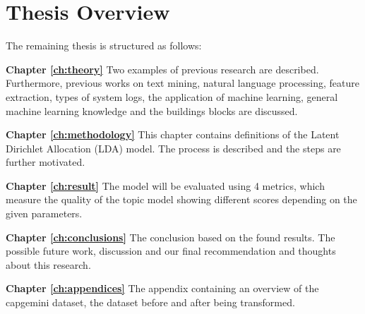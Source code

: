 \section{Thesis Overview} \label{introduction:thesisoverview}
The remaining thesis is structured as follows:

\setlength{\parindent}{3ex} \textbf{Chapter \ref{ch:theory}}\: Two examples of previous research are described. Furthermore, previous works on text mining, natural language processing, feature extraction, types of system logs, the application of machine learning, general machine learning knowledge and the buildings blocks are discussed.

\textbf{Chapter \ref{ch:methodology}}\: This chapter contains definitions of the Latent Dirichlet Allocation (LDA) model. The process is described and the steps are further motivated. 

\textbf{Chapter \ref{ch:result}}\: The model will be evaluated using 4 metrics, which measure the quality of the topic model showing different scores depending on the given parameters.

\textbf{Chapter \ref{ch:conclusions}}\: The conclusion based on the found results. The possible future work, discussion and our final recommendation and thoughts about this research.

\textbf{Chapter \ref{ch:appendices}}\: The appendix containing an overview of the capgemini dataset, the dataset before and after being transformed.


\begin{comment}
It is recommended to end the introduction with an overview of the thesis. This chapter contains the introduction; Chapter~\ref{ch:definitions} includes the definitions; Chapter~\ref{ch:relatedwork} discusses related work; Chapter~\ref{ch:evaluation} evaluates the contributions; Chapter~\ref{ch:conclusions} concludes.

Also make a nice sentence with ``bachelor thesis'', LIACS and the names of the supervisors.

\end{comment}